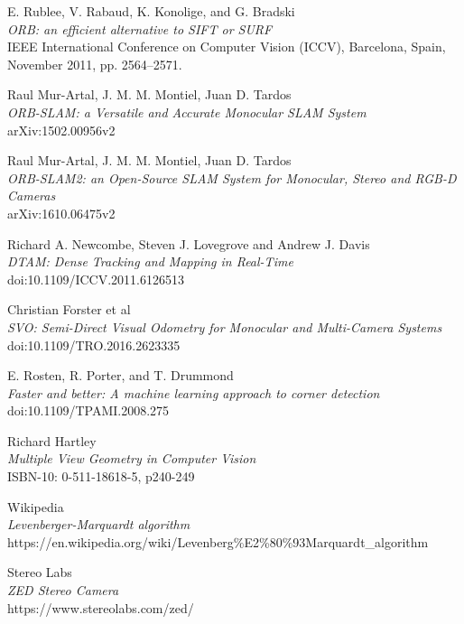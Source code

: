 \documentclass[11pt,a4paper,titlepage,oneside]{report}
\begin{document}
\begin{thebibliography}{1}

	E. Rublee, V. Rabaud, K. Konolige, and G. Bradski\\
	\textit{ORB: an efficient alternative to SIFT or SURF}\\
	IEEE International Conference on Computer Vision (ICCV), Barcelona, Spain, November 2011, pp. 2564–2571.

  Raul Mur-Artal, J. M. M. Montiel, Juan D. Tardos\\
  \textit{ORB-SLAM: a Versatile and Accurate Monocular SLAM System}\\
  arXiv:1502.00956v2

  Raul Mur-Artal, J. M. M. Montiel, Juan D. Tardos\\
  \textit{ORB-SLAM2: an Open-Source SLAM System for Monocular, Stereo and RGB-D Cameras}\\
	arXiv:1610.06475v2 

	Richard A. Newcombe, Steven J. Lovegrove and Andrew J. Davis\\
	\textit{DTAM: Dense Tracking and Mapping in Real-Time}\\
	doi:10.1109/ICCV.2011.6126513

	Christian Forster et al\\
	\textit{SVO: Semi-Direct Visual Odometry for Monocular and Multi-Camera Systems}\\
	doi:10.1109/TRO.2016.2623335

	E. Rosten, R. Porter, and T. Drummond \\
	\textit{Faster and better: A machine learning approach to corner detection}\\
	doi:10.1109/TPAMI.2008.275

	Richard Hartley\\
	\textit{Multiple View Geometry in Computer Vision}\\
	ISBN-10: 0-511-18618-5, p240-249

	Wikipedia\\
	\textit{Levenberger-Marquardt algorithm}\\
	https://en.wikipedia.org/wiki/Levenberg\%E2\%80\%93Marquardt\_algorithm

	Stereo Labs\\
	\textit{ZED Stereo Camera}\\
	https://www.stereolabs.com/zed/


\end{thebibliography}
\end{document}
